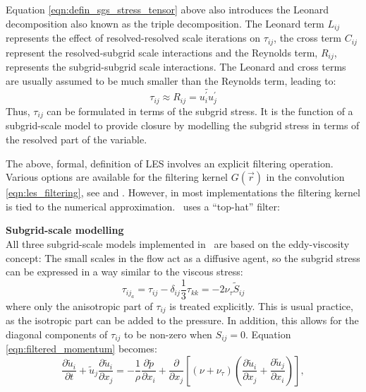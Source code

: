 Equation \eqref{eqn:defin_sgs_stress_tensor} above also introduces the Leonard decomposition
\citep{leonard1974} also known as the triple decomposition. The Leonard term $L_{ij}$ represents
the effect of resolved-resolved scale iterations on $\tau_{ij}$, the cross term
$C_{ij}$ represent the resolved-subgrid scale interactions and 
the Reynolds term, $R_{ij}$, represents the subgrid-subgrid scale interactions.
The Leonard and cross terms are usually assumed to be much smaller than the Reynolds term, leading to:
\begin{equation}
\tau_{ij} \approx R_{ij} = \widetilde{u_i^\prime u_j^\prime}
\label{eqn:sgs_stress_approx}
\end{equation}
Thus, $\tau_{ij}$ can be formulated in terms of the subgrid stress. It is the function of a subgrid-scale
model to provide closure by modelling the subgrid stress in terms of the resolved part of the variable.
\par
The above, formal, definition of LES involves an explicit filtering operation. Various options are available
for the filtering kernel $G \left( \overrightarrow{r} \right)$ in the convolution \eqref{eqn:les_filtering}, see \cite{pope2000} and \cite{sagaut1998}. However, in most implementations the filtering kernel is tied
to the numerical approximation. \fluidity\ uses a ``top-hat'' filter:

\par{\textbf{Subgrid-scale modelling}\\}
All three subgrid-scale models implemented in \fluidity\ are based on the eddy-viscosity concept: The small
scales in the flow act as a diffusive agent, so the subgrid stress can be expressed in a way similar to the
viscous stress:
\begin{equation}
\tau_{{ij}_a} = \tau_{ij} - \delta_{ij} \frac 1 3 \tau_{kk} = -2 \nu_\tau \tilde S_{ij}
\label{eqn:eddy_viscosity_concept} 
\end{equation}
where only the anisotropic part of $\tau_{ij}$ is treated explicitly. This is usual practice, as the isotropic
part can be added to the pressure. In addition, this allows for the diagonal components of $\tau_{ij}$
to be non-zero when $S_{ij}=0$. Equation \eqref{eqn:filtered_momentum} becomes:
\begin{equation}
\frac{\partial \tilde u_i}{\partial t} + \tilde u_j \frac{\partial \tilde u_i}{\partial x_j}
 = -\frac 1 \rho \frac{\partial \tilde p}{\partial x_i}
 + \frac{\partial}{\partial x_j} \left [ (\nu + \nu_\tau) \left ( \frac{\partial \tilde u_i}{\partial x_j} + \frac{\partial \tilde u_j}{\partial x_i} \right ) \right ],
\end{equation}

